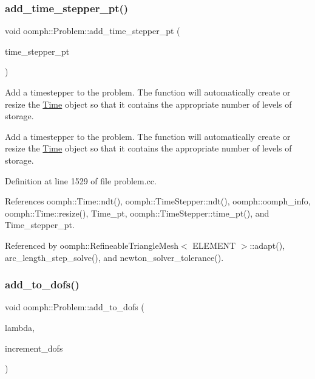 \subsubsection{\texorpdfstring{add\+\_\+time\+\_\+stepper\+\_\+pt()}{add\_time\_stepper\_pt()}}
{\footnotesize\ttfamily void oomph\+::\+Problem\+::add\+\_\+time\+\_\+stepper\+\_\+pt (\begin{DoxyParamCaption}\item[{\hyperlink{classoomph_1_1TimeStepper}{Time\+Stepper} $\ast$const \&}]{time\+\_\+stepper\+\_\+pt }\end{DoxyParamCaption})}



Add a timestepper to the problem. The function will automatically create or resize the \hyperlink{classoomph_1_1Time}{Time} object so that it contains the appropriate number of levels of storage. 

Add a timestepper to the problem. The function will automatically create or resize the \hyperlink{classoomph_1_1Time}{Time} object so that it contains the appropriate number of levels of storage. 

Definition at line 1529 of file problem.\+cc.



References oomph\+::\+Time\+::ndt(), oomph\+::\+Time\+Stepper\+::ndt(), oomph\+::oomph\+\_\+info, oomph\+::\+Time\+::resize(), Time\+\_\+pt, oomph\+::\+Time\+Stepper\+::time\+\_\+pt(), and Time\+\_\+stepper\+\_\+pt.



Referenced by oomph\+::\+Refineable\+Triangle\+Mesh$<$ E\+L\+E\+M\+E\+N\+T $>$\+::adapt(), arc\+\_\+length\+\_\+step\+\_\+solve(), and newton\+\_\+solver\+\_\+tolerance().

\mbox{\label{classoomph_1_1Problem_a352210408b3eed3e7a834b8b9a33a99a}} 
\subsubsection{\texorpdfstring{add\+\_\+to\+\_\+dofs()}{add\_to\_dofs()}}
{\footnotesize\ttfamily void oomph\+::\+Problem\+::add\+\_\+to\+\_\+dofs (\begin{DoxyParamCaption}\item[{const double \&}]{lambda,  }\item[{const \hyperlink{classoomph_1_1DoubleVector}{Double\+Vector} \&}]{increment\+\_\+dofs }\end{DoxyParamCaption})\hspace{0.3cm}{\ttfamily [virtual]}}



